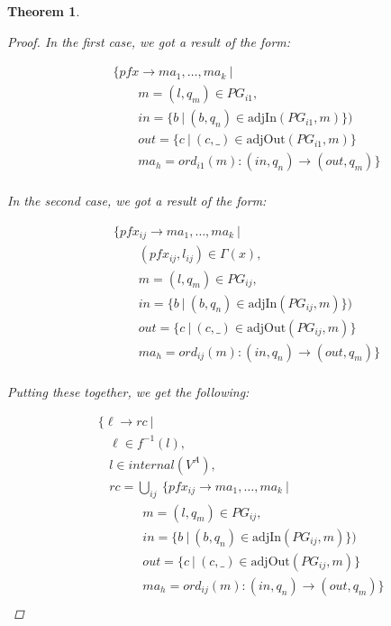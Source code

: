 \documentclass[twocolumn]{sig-alternate-10pt}
\newtheorem{thm}{Theorem}[section]
\begin{document}
\begin{thm}
\begin{proof}
  In the first case, we got a result of the form:

  \[ \begin{array}{l}
     ~~~~~~~~~ \{ pfx \rightarrow ma_1, \dots, ma_k ~\vert~ \\
     ~~~~~~~~~~~~~~~~~~ m = (l,q_m) \in PG_{i1}, \\
     ~~~~~~~~~~~~~~~~~~ in = \{ b ~\vert~ (b,q_n) \in \text{adjIn}(PG_{i1},m) \}) \\
     ~~~~~~~~~~~~~~~~~~ out = \{ c ~\vert~ (c,\_) \in \text{adjOut}(PG_{i1},m) \} \\
     ~~~~~~~~~~~~~~~~~~ ma_h = ord_{i1}(m) : (in,q_n) \rightarrow (out,q_m) \} \\
  \end{array} \]%

  In the second case, we got a result of the form:

 \[ \begin{array}{l}
     ~~~~~~~~~ \{ pfx_{ij} \rightarrow ma_1, \dots, ma_k ~\vert~ \\
     ~~~~~~~~~~~~~~~~~~ (pfx_{ij}, l_{ij}) \in \Gamma(x), \\
     ~~~~~~~~~~~~~~~~~~ m = (l,q_m) \in PG_{ij}, \\
     ~~~~~~~~~~~~~~~~~~ in = \{ b ~\vert~ (b,q_n) \in \text{adjIn}(PG_{ij},m) \}) \\
     ~~~~~~~~~~~~~~~~~~ out = \{ c ~\vert~ (c,\_) \in \text{adjOut}(PG_{ij},m) \} \\
     ~~~~~~~~~~~~~~~~~~ ma_h = ord_{ij}(m) : (in,q_n) \rightarrow (out,q_m) \} \\
  \end{array} \]%

  Putting these together, we get the following:

  \[ \begin{array}{l}
     ~~~~~ \{ \ell \rightarrow rc ~\vert~ \\
     ~~~~~~~~~ \ell \in f^{-1}(l), \\
     ~~~~~~~~~ l \in internal(V^A), \\
     ~~~~~~~~~ rc = \bigcup_{ij}~ \{ pfx_{ij} \rightarrow ma_1, \dots, ma_k ~\vert~ \\
     ~~~~~~~~~~~~~~~~~~~~~ m = (l,q_m) \in PG_{ij}, \\
     ~~~~~~~~~~~~~~~~~~~~~ in = \{ b ~\vert~ (b,q_n) \in \text{adjIn}(PG_{ij},m) \}) \\
     ~~~~~~~~~~~~~~~~~~~~~ out = \{ c ~\vert~ (c,\_) \in \text{adjOut}(PG_{ij},m) \} \\
     ~~~~~~~~~~~~~~~~~~~~~ ma_h = ord_{ij}(m) : (in,q_n) \rightarrow (out,q_m) \} \\
  \end{array} \]%



\end{proof}
\end{thm}
\end{document}
